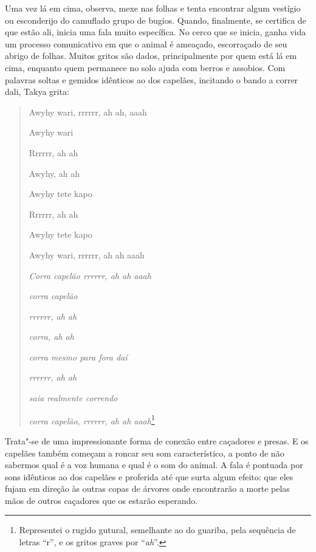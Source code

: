 Uma vez lá em cima, observa, mexe nas folhas e tenta encontrar algum
vestígio ou esconderijo do camuflado grupo de bugios. Quando,
finalmente, se certifica de que estão ali, inicia uma fala muito
específica. No cerco que se inicia, ganha vida um processo comunicativo
em que o animal é ameaçado, escorraçado de seu abrigo de folhas. Muitos
gritos são dados, principalmente por quem está lá em cima, enquanto quem
permanece no solo ajuda com berros e assobios. Com palavras soltas e
gemidos idênticos ao dos capelães, incitando o bando a correr dali,
Takya grita:

\begin{quote}
\begin{center}
Awyhy wari, rrrrrr, ah ah, aaah

Awyhy wari

Rrrrrr, ah ah

Awyhy, ah ah

Awyhy tete kapo

Rrrrrr, ah ah 

Awyhy tete kapo

Awyhy wari, rrrrrr, ah ah aaah

\emph{}

\emph{Corra capelão rrrrrr, ah ah aaah}

\emph{corra capelão}

\emph{rrrrrr, ah ah}

\emph{corra, ah ah}

\emph{corra mesmo para fora daí}

\emph{rrrrrr, ah ah}

\emph{saia realmente correndo}

\emph{corra capelão, rrrrrr, ah ah aaah}\footnote{Representei o rugido gutural,
  semelhante ao do guariba, pela sequência de letras ``r'', e os gritos
  graves por ``\emph{ah}''.}
\end{center}
\end{quote}

Trata"-se de uma impressionante forma de conexão entre caçadores e
presas. E os capelães também começam a roncar seu som característico, a
ponto de não sabermos qual é a voz humana e qual é o som do animal. A
fala é pontuada por sons idênticos ao dos capelães e proferida até que
surta algum efeito: que eles fujam em direção às outras copas de árvores
onde encontrarão a morte pelas mãos de outros caçadores que os estarão
esperando.

